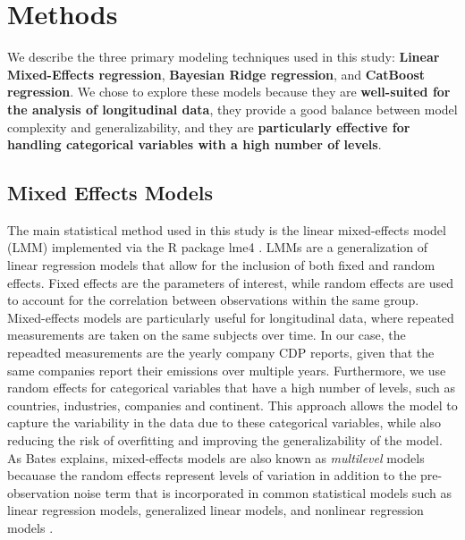 \chapter{Methods}

\begin{keytakeaway}
    We describe the three primary modeling techniques used in this study: \textbf{Linear Mixed-Effects regression}, \textbf{Bayesian Ridge regression}, and \textbf{CatBoost regression}. We chose to explore these models because they are \textbf{well-suited for the analysis of longitudinal data}, they provide a good balance between model complexity and generalizability, and they are \textbf{particularly effective for handling categorical variables with a high number of levels}.
\end{keytakeaway}

\section{Mixed Effects Models}

The main statistical method used in this study is the linear mixed-effects model (LMM) implemented via the R package lme4 \cite{lmer}. LMMs are a generalization of linear regression models that allow for the inclusion of both fixed and random effects. Fixed effects are the parameters of interest, while random effects are used to account for the correlation between observations within the same group. Mixed-effects models are particularly useful for longitudinal data, where repeated measurements are taken on the same subjects over time. In our case, the repeadted measurements are the yearly company CDP reports, given that the same companies report their emissions over multiple years. Furthermore, we use random effects for categorical variables that have a high number of levels, such as countries, industries, companies and continent. This approach allows the model to capture the variability in the data due to these categorical variables, while also reducing the risk of overfitting and improving the generalizability of the model. As Bates explains, mixed-effects models are also known as \textit{multilevel} models becauase the random effects represent levels of variation in addition to the pre-observation noise term that is incorporated in common statistical models such as linear regression models, generalized linear models, and nonlinear regression models \cite{bates}. 

